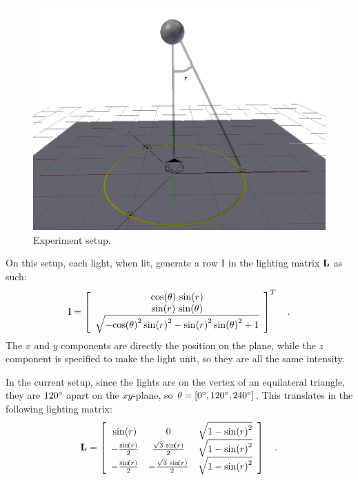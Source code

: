 \documentclass{report}
\begin{document}
\begin{figure}
  \centering
  \includegraphics[width=0.9\linewidth]{q3_setup.png}
  \caption[Experiment setup]
   {Experiment setup.}
  \label{q3:setup}
\end{figure}

On this setup, each light, when lit, generate a row $\mathbf{l}$ in the lighting matrix $\mathbf{L}$ as such:
\begin{equation}
\B{l} =
\left[\begin{array}{c} \cos\!\left(\theta\right)\, \sin\!\left(r\right) \\ \sin\!\left(r\right)\, \sin\!\left(\theta\right) \\ \sqrt{ - {\cos\!\left(\theta\right)}^2\, {\sin\!\left(r\right)}^2 - {\sin\!\left(r\right)}^2\, {\sin\!\left(\theta\right)}^2 + 1} \end{array}\right]^T
\quad .
\end{equation}
The $x$ and $y$ components are directly the position on the plane, while the $z$ component is specified to make the light unit, so they are all the same intensity.

In the current setup, since the lights are on the vertex of an equilateral triangle, they are $120\degree$ apart on the $xy$-plane, so $\theta = \left[ 0\degree, 120\degree, 240\degree \right]$. This translates in the following lighting matrix:
\begin{equation}
\B{L} =
\left[\begin{array}{ccc} \sin\!\left(r\right) & 0 & \sqrt{1 - {\sin\!\left(r\right)}^2}\\ -\frac{\sin\!\left(r\right)}{2} & \frac{\sqrt{3}\, \sin\!\left(r\right)}{2} & \sqrt{1 - {\sin\!\left(r\right)}^2}\\ -\frac{\sin\!\left(r\right)}{2} & -\frac{\sqrt{3}\, \sin\!\left(r\right)}{2} & \sqrt{1 - {\sin\!\left(r\right)}^2} \end{array}\right]
\quad .
\end{equation}
\end{document}
